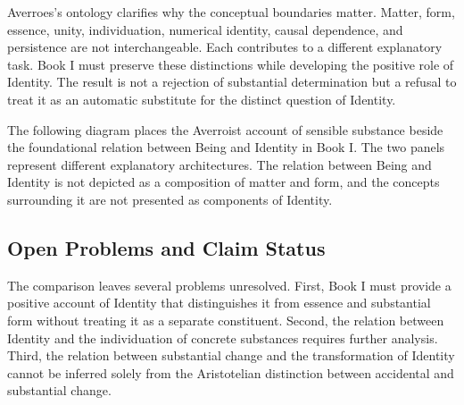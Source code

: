 \label{para:VS.B01.P01.C08.S15.SS17.P002}

Averroes's ontology clarifies why the
conceptual boundaries matter. Matter,
form, essence, unity, individuation,
numerical identity, causal dependence,
and persistence are not interchangeable.
Each contributes to a different explanatory
task. Book I must preserve these distinctions
while developing the positive role of
Identity. The result is not a rejection
of substantial determination but a refusal
to treat it as an automatic substitute
for the distinct question of Identity.

\label{para:VS.B01.P01.C08.S15.SS17.P003}

The following diagram places the
Averroist account of sensible substance
beside the foundational relation between
Being and Identity in Book I. The
two panels represent different explanatory
architectures. The relation between
Being and Identity is not depicted as
a composition of matter and form, and
the concepts surrounding it are not
presented as components of Identity.

\label{para:VS.B01.P01.C08.S15.SS17.P004}





\subsection{Open Problems and Claim Status}
\label{subsec:ch08_s15_ss18}

\label{para:VS.B01.P01.C08.S15.SS18.P001}

The comparison leaves several problems
unresolved. First, Book I must provide
a positive account of Identity that
distinguishes it from essence and
substantial form without treating it
as a separate constituent. Second, the
relation between Identity and the
individuation of concrete substances
requires further analysis. Third, the
relation between substantial change
and the transformation of Identity
cannot be inferred solely from the
Aristotelian distinction between
accidental and substantial change.

